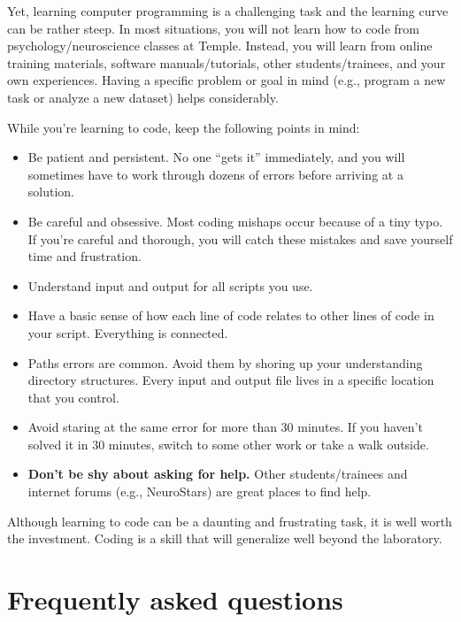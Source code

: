 \documentclass[letterpaper,12pt,oneside]{memoir}
\begin{document}
{Yet, learning computer programming is a challenging task and the learning curve can be rather steep. In most situations, you will not learn how to code from psychology/neuroscience classes at Temple. Instead, you will learn from online training materials, software manuals/tutorials, other students/trainees, and your own experiences. Having a specific problem or goal in mind (e.g., program a new task or analyze a new dataset) helps considerably.

While you're learning to code, keep the following points in mind:

\begin{itemize}

\item Be patient and persistent. No one ``gets it'' immediately, and you will sometimes have to work through dozens of errors before arriving at a solution. 
\item Be careful and obsessive. Most coding mishaps occur because of a tiny typo. If you're careful and thorough, you will catch these mistakes and save yourself time and frustration. 
\item Understand input and output for all scripts you use.
\item Have a basic sense of how each line of code relates to other lines of code in your script. Everything is connected. 
\item Paths errors are common. Avoid them by shoring up your understanding directory structures. Every input and output file lives in a specific location that you control. 
\item Avoid staring at the same error for more than 30 minutes. If you haven't solved it in 30 minutes, switch to some other work or take a walk outside.
\item \textbf{Don't be shy about asking for help.} Other students/trainees and internet forums (e.g., NeuroStars) are great places to find help.

\end{itemize}


\begin{shaded}
\noindent Although learning to code can be a daunting and frustrating task, it is well worth the investment. Coding is a skill that will generalize well beyond the laboratory.
\end{shaded}


\chapter{Frequently asked questions}

}
\end{document}
